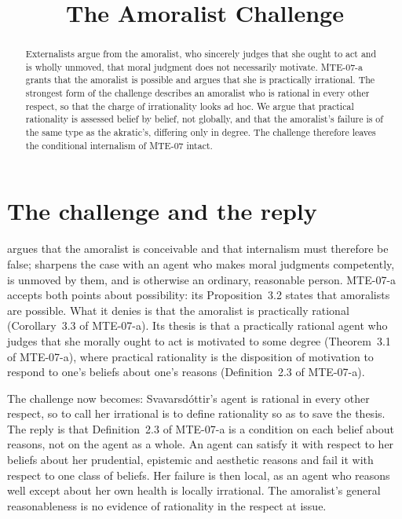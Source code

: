\documentclass{situationist-preprint}
\title{The Amoralist Challenge}
\begin{document}
\maketitle

\begin{abstract}
Externalists argue from the amoralist, who sincerely judges that she ought to act and is wholly unmoved, that moral judgment does not necessarily motivate. MTE-07-a grants that the amoralist is possible and argues that she is practically irrational. The strongest form of the challenge describes an amoralist who is rational in every other respect, so that the charge of irrationality looks ad hoc. We argue that practical rationality is assessed belief by belief, not globally, and that the amoralist's failure is of the same type as the akratic's, differing only in degree. The challenge therefore leaves the conditional internalism of MTE-07 intact.
\end{abstract}

\section{The challenge and the reply}\label{s:ch}

\citet{Brink1986} argues that the amoralist is conceivable and that internalism must therefore be false; \citet{Svavarsdottir1999} sharpens the case with an agent who makes moral judgments competently, is unmoved by them, and is otherwise an ordinary, reasonable person. MTE-07-a accepts both points about possibility: its Proposition~3.2 states that amoralists are possible. What it denies is that the amoralist is practically rational (Corollary~3.3 of MTE-07-a). Its thesis is that a practically rational agent who judges that she morally ought to act is motivated to some degree (Theorem~3.1 of MTE-07-a), where practical rationality is the disposition of motivation to respond to one's beliefs about one's reasons (Definition~2.3 of MTE-07-a).

The challenge now becomes: Svavarsdóttir's agent is rational in every other respect, so to call her irrational is to define rationality so as to save the thesis. The reply is that Definition~2.3 of MTE-07-a is a condition on each belief about reasons, not on the agent as a whole. An agent can satisfy it with respect to her beliefs about her prudential, epistemic and aesthetic reasons and fail it with respect to one class of beliefs. Her failure is then local, as an agent who reasons well except about her own health is locally irrational. The amoralist's general reasonableness is no evidence of rationality in the respect at issue.
\end{document}
